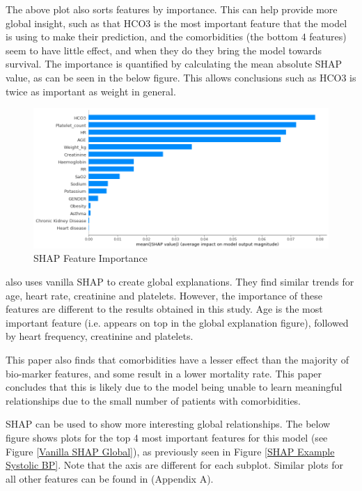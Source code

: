 \documentclass[12pt]{article}
\begin{document}
The above plot also sorts features by importance. This can help provide more global insight, such as that HCO3 is the most important feature that the model is using to make their prediction, and the comorbidities (the bottom 4 features) seem to have little effect, and when they do they bring the model towards survival. 
The importance is quantified by calculating the mean absolute SHAP value, as can be seen in the below figure. This allows conclusions such as HCO3 is twice as important as weight in general. 

\begin{figure}[H]
\centering\caption{SHAP Feature Importance }
\includegraphics[scale=0.4]{Vanilla SHAP Feature Importance.png}
\end{figure}

\cite{ICUFancyLSTM} also uses vanilla SHAP to create global explanations. They find similar trends for age, heart rate, creatinine and platelets. However, the importance of these features are different to the results obtained in this study. Age is the most important feature (i.e. appears on top in the global explanation figure), followed by heart frequency, creatinine and platelets.

This paper also finds that comorbidities have a lesser effect than the majority of bio-marker features, and some result in a lower mortality rate. This paper concludes that this is likely due to the model being unable to learn meaningful relationships due to the small number of patients with comorbidities.

SHAP can be used to show more interesting global relationships. The below figure shows plots for the top 4 most important features for this model (see Figure \ref{Vanilla SHAP Global}), as previously seen in Figure \ref{SHAP Example Systolic BP}. Note that the axis are different for each subplot. Similar plots for all other features can be found in (Appendix A).
\end{document}
